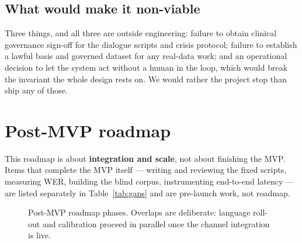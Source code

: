 \documentclass[11pt,a4paper]{article}
\begin{document}
\subsection{What would make it non-viable}
Three things, and all three are outside engineering: failure to obtain clinical governance sign-off
for the dialogue scripts and crisis protocol; failure to establish a lawful basis and governed
dataset for any real-data work; and an operational decision to let the system act without a human in
the loop, which would break the invariant the whole design rests on. We would rather the project stop
than ship any of those.

\section{Post-MVP roadmap}
\label{sec:roadmap}

This roadmap is about \textbf{integration and scale}, not about finishing the MVP. Items that
complete the MVP itself --- writing and reviewing the fixed scripts, measuring WER, building the blind
corpus, instrumenting end-to-end latency --- are listed separately in Table~\ref{tab:gaps} and are
pre-launch work, not roadmap.

\begin{figure}[!htbp]
\centering
{}
\caption{Post-MVP roadmap phases. Overlaps are deliberate: language roll-out and calibration proceed
in parallel once the channel integration is live.}
\label{fig:roadmap}
\end{figure}
\end{document}
